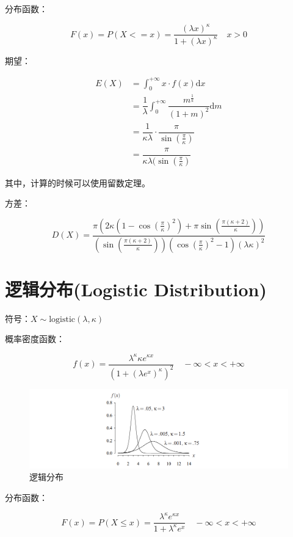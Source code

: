 \documentclass[12pt, a4paper, oneside]{ctexbook}
\begin{document}
 分布函数：

$$
F(x) = P(X <= x) = \dfrac{(\lambda x)^{\kappa}}{1 + (\lambda x)^{\kappa}}  \quad x > 0
$$

 期望：

$$
\begin{aligned}
E(X) &= \int_0^{+\infty} x \cdot f(x) \mathrm{d}x \\
&= \dfrac{1}{\lambda} \int_0^{+\infty}\dfrac{m^{\frac{1}{k}}}{(1+m)^{2}} \mathrm{d}m \\
&= \dfrac{1}{\kappa \lambda} \cdot \dfrac{\pi}{\sin (\frac{\pi}{\kappa})} \\
&= \dfrac{\pi}{\kappa \lambda(\sin (\frac{\pi}{\kappa})}
\end{aligned}
$$

其中，计算的时候可以使用留数定理。

 方差：

$$
D(X) = \dfrac{\pi \left(2\kappa(1 - \cos (\frac{\pi}{\kappa})^{2}) + \pi\sin(\frac{\pi(\kappa + 2)}{\kappa}) \right)}{\left(\sin (\frac{\pi(\kappa + 2)}{\kappa}) \right)\left( \cos(\frac{\pi}{\kappa})^{2} - 1\right)(\lambda \kappa)^{2}}
$$

\section{逻辑分布(Logistic Distribution)}

 符号：$X \sim \text{logistic}(\lambda, \kappa)$

 概率密度函数：

$$
f(x) = \dfrac{\lambda^{\kappa}\kappa e^{\kappa x}}{(1 + (\lambda e^{x})^{\kappa})^{2}} \quad -\infty < x < +\infty
$$

\begin{figure}[H]
  \centering
  \includegraphics[width=1\textwidth]{image/逻辑分布.png}
  \caption{逻辑分布}
  \label{fig:example}
\end{figure}

 分布函数：

$$
F(x) = P(X \leq x) = \dfrac{\lambda^{\kappa}e^{\kappa x}}{1 + \lambda^{\kappa}e^{x}} \quad -\infty < x < +\infty
$$
\end{document}
